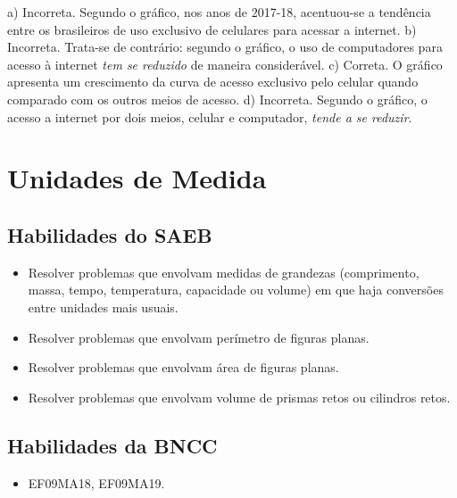 \begin{escolha}
\begin{escolha}
\begin{escolha}
\begin{escolha}
{\begin{boxmedio}
\begin{boxpeq}
\begin{q°}
\begin{boxmedio}
\begin{boxpeq}
\begin{boxpeq}
\begin{boxmedio}
\begin{boxmedio}
\begin{boxmedio}
\begin{largebox}
\begin{boxmedio}
{a) Incorreta. Segundo o gráfico, nos anos de 2017-18, acentuou-se a tendência entre os
brasileiros de uso exclusivo de celulares para acessar a internet. 
b) Incorreta. Trata-se de contrário: segundo o gráfico, o uso de computadores para acesso
à internet \textit{tem se reduzido} de maneira considerável.
c) Correta. O gráfico apresenta um crescimento da curva de acesso exclusivo pelo
celular quando comparado com os outros meios de acesso.
d) Incorreta. Segundo o gráfico, o acesso a internet por dois meios, celular e computador,
\textit{tende a se reduzir}.}

\chapter{Unidades de Medida}

\section{Habilidades do SAEB}

\begin{itemize}

  \item Resolver problemas que envolvam medidas de grandezas (comprimento,
massa, tempo, temperatura, capacidade ou volume) em que haja
conversões entre unidades mais usuais. 
  \item Resolver problemas que envolvam perímetro de figuras planas. 
  \item Resolver problemas que envolvam área de figuras planas. 
  \item Resolver problemas que envolvam volume de prismas retos ou cilindros
retos.  

\end{itemize} 

\section{Habilidades da BNCC}

\begin{itemize}
  \item EF09MA18, EF09MA19. 
\end{itemize}

\end{boxmedio}
\end{largebox}
\end{boxmedio}
\end{boxmedio}
\end{boxmedio}
\end{boxpeq}
\end{boxpeq}
\end{boxmedio}
\end{q°}
\end{boxpeq}
\end{boxmedio}}
\end{escolha}
\end{escolha}
\end{escolha}
\end{escolha}
